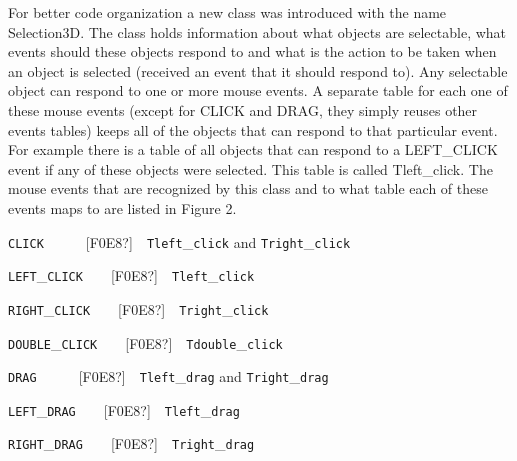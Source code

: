 \documentclass[letterpaper]{article}
\begin{document}
\bigskip

{
For better code organization a new class was introduced with the name Selection3D. The class holds information about
what objects are selectable, what events should these objects respond to and what is the action to be taken when an
object is selected (received an event that it should respond to). Any selectable object can respond to one or more
mouse events. A separate table for each one of these mouse events (except for \textsf{CLICK} and \textsf{DRAG}, they
simply reuses other events tables) keeps all of the objects that can respond to that particular event. For example
there is a table of all objects that can respond to a \textsf{LEFT}\textsf{\_}\textsf{CLICK} event if any of these
objects were selected. This table is called \textsf{Tleft}\textsf{\_}\textsf{click}. The mouse events that are
recognized by this class and to what table each of these events maps to are listed in Figure 2.}



\begin{center}
\begin{minipage}{4.8445in}

\bigskip

{
\texttt{CLICK}\ \ \ \ \ \ [F0E8?]\ \ \texttt{Tleft}\_\texttt{click} and \texttt{Tright}\_\texttt{click}}

{
\texttt{LEFT}\_\texttt{CLICK}\ \ \ \ [F0E8?]\ \ \texttt{Tleft}\_\texttt{click}}

{
\texttt{RIGHT}\_\texttt{CLICK}\ \ \ \ [F0E8?]\ \ \texttt{Tright}\_\texttt{click}}

{
\texttt{DOUBLE}\_\texttt{CLICK}\ \ \ \ [F0E8?]\ \ \texttt{Tdouble}\_\texttt{click}}

{
\texttt{DRAG}\ \ \ \ \ \ [F0E8?]\ \ \texttt{Tleft}\_\texttt{drag} and \texttt{Tright}\_\texttt{drag}}

{
\texttt{LEFT}\_\texttt{DRAG}\ \ \ \ [F0E8?]\ \ \texttt{Tleft}\_\texttt{drag}}

{
\texttt{RIGHT}\_\texttt{DRAG}\ \ \ \ [F0E8?]\ \ \texttt{Tright}\_\texttt{drag}}


\bigskip
\end{minipage}
\end{center}

\bigskip


\bigskip
\end{document}
